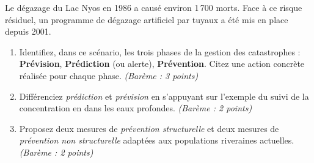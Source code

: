 \documentclass[11pt]{article}
\begin{document}
\begin{exercice}
Le dégazage du Lac Nyos en 1986 a causé environ 1\,700 morts. Face à ce risque résiduel, un programme de dégazage artificiel par tuyaux a été mis en place depuis 2001.

\begin{enumerate}
    \item Identifiez, dans ce scénario, les trois phases de la gestion des catastrophes : \textbf{Prévision}, \textbf{Prédiction} (ou alerte), \textbf{Prévention}. Citez une action concrète réalisée pour chaque phase. \textit{(Barème : 3 points)}
    \item Différenciez \textit{prédiction} et \textit{prévision} en s'appuyant sur l'exemple du suivi de la concentration en  dans les eaux profondes. \textit{(Barème : 2 points)}
    \item Proposez deux mesures de \textit{prévention structurelle} et deux mesures de \textit{prévention non structurelle} adaptées aux populations riveraines actuelles. \textit{(Barème : 2 points)}
\end{enumerate}
\end{exercice}
\end{document}
